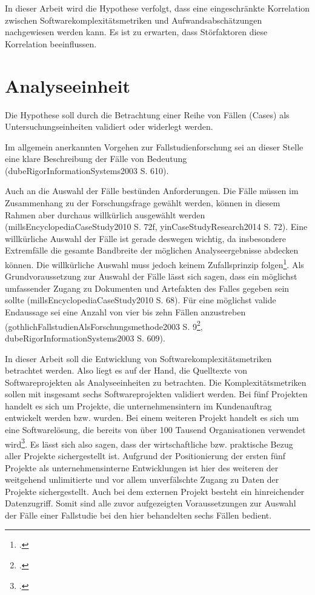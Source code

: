 In dieser Arbeit wird die Hypothese verfolgt, dass eine eingeschränkte
Korrelation zwischen Softwarekomplexitätsmetriken und
Aufwandsabschätzungen nachgewiesen werden kann. Es ist zu erwarten, dass
Störfaktoren diese Korrelation beeinflussen.

\section{Analyseeinheit}\label{analyseeinheit}

Die Hypothese soll durch die Betrachtung einer Reihe von Fällen (Cases)
als Untersuchungseinheiten validiert oder widerlegt werden.

Im allgemein anerkannten Vorgehen zur Fallstudienforschung sei an dieser
Stelle eine klare Beschreibung der Fälle von Bedeutung
(dubeRigorInformationSystems2003 S. 610).

Auch an die Auswahl der Fälle bestünden Anforderungen. Die Fälle müssen
im Zusammenhang zu der Forschungsfrage gewählt werden, können in diesem
Rahmen aber durchaus willkürlich ausgewählt werden
(millsEncyclopediaCaseStudy2010 S. 72f, yinCaseStudyResearch2014 S. 72).
Eine willkürliche Auswahl der Fälle ist gerade deswegen wichtig, da
insbesondere Extremfälle die gesamte Bandbreite der möglichen
Analyseergebnisse abdecken können. Die willkürliche Auswahl muss jedoch
keinem Zufallsprinzip folgen\footcite[Vgl. ][]{Quelle fehlt (Ausreißer und
  Extremfälle gerade an diesen Extremfällen gelegen, da sie die
  Bandbreite abstecken, innerhalb derer sich die Realität bewegt und
  relevante Phänomene in diesen Fällen am deutlichsten zu Tage treten.)}.
Als Grundvoraussetzung zur Auswahl der Fälle lässt sich sagen, dass ein
möglichst umfassender Zugang zu Dokumenten und Artefakten des Falles
gegeben sein sollte (millsEncyclopediaCaseStudy2010 S. 68). Für eine
möglichst valide Endaussage sei eine Anzahl von vier bis zehn Fällen
anzustreben (gothlichFallstudienAlsForschungsmethode2003 S.
9\footcite[Vgl. ][]{Eisenhardt, Kathleen M. (1989): 'Building Theories from Case
  Study Research', in: Academy of Management Review, Vol. 14, No. 4, S.
  532-550.}, dubeRigorInformationSystems2003 S. 609).

In dieser Arbeit soll die Entwicklung von Softwarekomplexitätsmetriken
betrachtet werden. Also liegt es auf der Hand, die Quelltexte von
Softwareprojekten als Analyseeinheiten zu betrachten. Die
Komplexitätsmetriken sollen mit insgesamt sechs Softwareprojekten
validiert werden. Bei fünf Projekten handelt es sich um Projekte, die
unternehmensintern im Kundenauftrag entwickelt werden bzw. wurden. Bei
einem weiteren Projekt handelt es sich um eine Softwarelösung, die
bereits von über 100 Tausend Organisationen verwendet wird\footcite[Vgl. ][]{GitLabGitLab}.
Es lässt sich also sagen, dass der wirtschaftliche bzw. praktische Bezug
aller Projekte sichergestellt ist. Aufgrund der Positionierung der
ersten fünf Projekte als unternehmensinterne Entwicklungen ist hier des
weiteren der weitgehend unlimitierte und vor allem unverfälschte Zugang
zu Daten der Projekte sichergestellt. Auch bei dem externen Projekt
besteht ein hinreichender Datenzugriff. Somit sind alle zuvor
aufgezeigten Voraussetzungen zur Auswahl der Fälle einer Fallstudie bei
den hier behandelten sechs Fällen bedient.

